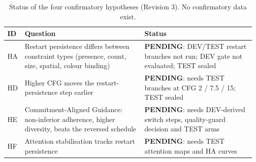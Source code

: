 \begin{table}[t]
\centering\small
\caption{Status of the four confirmatory hypotheses (Revision 3). No confirmatory data exist.}
\label{tab:hypotheses}
\begin{tabular}{llp{6.2cm}}
\toprule
ID & Question & Status \\
\midrule
HA & Restart persistence differs between constraint types (presence, count, size, spatial, colour binding) & \textbf{PENDING}: DEV/TEST restart branches not run; DEV gate not evaluated; TEST sealed \\
HD & Higher CFG moves the restart-persistence step earlier & \textbf{PENDING}: needs TEST branches at CFG 2 / 7.5 / 15; TEST sealed \\
HE & Commitment-Aligned Guidance: non-inferior adherence, higher diversity, beats the reversed schedule & \textbf{PENDING}: needs DEV-derived switch steps, quality-guard decision and TEST arms \\
HF & Attention stabilisation tracks restart persistence & \textbf{PENDING}: needs TEST attention maps and HA curves \\
\bottomrule
\end{tabular}
\end{table}
